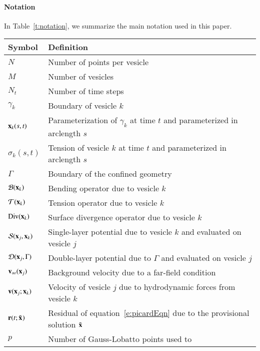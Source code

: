 \paragraph{Notation}
In Table~\ref{t:notation}, we summarize the main notation used in this
paper.
\begin{table}[htp]
\colorbox{gray!20}{
\begin{tabular}{|l|l|}
\hline
Symbol & Definition \\
\hline
$N$                         & Number of points per vesicle \\
$M$                         & Number of vesicles \\
$N_{t}$                     & Number of time steps \\
$\gamma_{k}$                & Boundary of vesicle $k$ \\
${\mathbf{x}}_{k}(s,t)$              & Parameterization of $\gamma_{k}$ at time
                              $t$ and parameterized in arclength $s$ \\
$\sigma_{k}(s,t)$           & Tension of vesicle $k$ at time $t$ and
                              parameterized in arclength $s$ \\
$\Gamma$                    & Boundary of the confined geometry \\
${\mathcal{B}}({\mathbf{x}}_{k})$              & Bending operator due to vesicle $k$ \\
${\mathcal{T}}({\mathbf{x}}_{k})$              & Tension operator due to vesicle $k$ \\
$\mathrm{Div}({\mathbf{x}}_{k})$             & Surface divergence operator due to 
                              vesicle $k$ \\
${\mathcal{S}}({\mathbf{x}}_{j},{\mathbf{x}}_{k})$      & Single-layer potential due to vesicle $k$ 
                              and evaluated on vesicle $j$ \\
${\mathcal{D}}({\mathbf{x}}_{j},\Gamma)$       & Double-layer potential due to $\Gamma$ 
                              and evaluated on vesicle $j$ \\
${\mathbf{v}}_{\infty}({\mathbf{x}}_{j})$     & Background velocity due to a far-field 
                              condition \\
${\mathbf{v}}({\mathbf{x}}_{j};{\mathbf{x}}_{k})$      & Velocity of vesicle $j$ due to
                              hydrodynamic forces from vesicle $k$ \\
${\mathbf{r}}(t;{\tilde{{\mathbf{x}}}_{}})$             & Residual of equation~\eqref{e:picardEqn} 
                              due to the provisional solution 
                              ${\tilde{{\mathbf{x}}}_{}}$ \\
$p$                         & Number of Gauss-Lobatto points used to

\end{tabular}}
\end{table}
